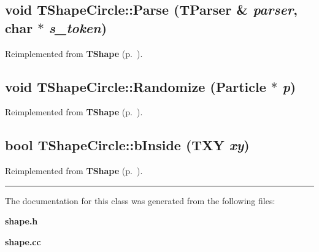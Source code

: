 \label{TShapeCircle_a1}
\subsection{\setlength{\rightskip}{0pt plus 5cm}void TShape\-Circle::Parse ({\bf TParser} \& {\em parser}, char $\ast$ {\em s\_\-token})\hspace{0.3cm}{\tt  [virtual]}}



Reimplemented from {\bf TShape} {\rm (p.~\pageref{TShape_a0})}.\label{TShapeCircle_a2}
\subsection{\setlength{\rightskip}{0pt plus 5cm}void TShape\-Circle::Randomize ({\bf Particle} $\ast$ {\em p})\hspace{0.3cm}{\tt  [virtual]}}



Reimplemented from {\bf TShape} {\rm (p.~\pageref{TShape_a1})}.\label{TShapeCircle_a3}
\subsection{\setlength{\rightskip}{0pt plus 5cm}bool TShape\-Circle::b\-Inside ({\bf TXY} {\em xy})\hspace{0.3cm}{\tt  [virtual]}}



Reimplemented from {\bf TShape} {\rm (p.~\pageref{TShape_a2})}.\vspace{0.4cm}\hrule\vspace{0.2cm}
The documentation for this class was generated from the following files:\begin{CompactItemize}
\item 
{\bf shape.h}\item 
{\bf shape.cc}\end{CompactItemize}
